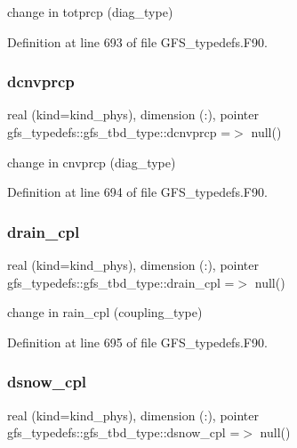 change in totprcp (diag\+\_\+type) 



Definition at line 693 of file G\+F\+S\+\_\+typedefs.\+F90.

\mbox{\label{structgfs__typedefs_1_1gfs__tbd__type_a1b0eebd6637eec35a350f3f991fa53cc}} 
\subsubsection{dcnvprcp}
{\footnotesize\ttfamily real (kind=kind\+\_\+phys), dimension  (\+:), pointer gfs\+\_\+typedefs\+::gfs\+\_\+tbd\+\_\+type\+::dcnvprcp =$>$ null()}



change in cnvprcp (diag\+\_\+type) 



Definition at line 694 of file G\+F\+S\+\_\+typedefs.\+F90.

\mbox{\label{structgfs__typedefs_1_1gfs__tbd__type_a5b9557b84e2622b9ba7d8fc0e8835231}} 
\subsubsection{drain\+\_\+cpl}
{\footnotesize\ttfamily real (kind=kind\+\_\+phys), dimension (\+:), pointer gfs\+\_\+typedefs\+::gfs\+\_\+tbd\+\_\+type\+::drain\+\_\+cpl =$>$ null()}



change in rain\+\_\+cpl (coupling\+\_\+type) 



Definition at line 695 of file G\+F\+S\+\_\+typedefs.\+F90.

\mbox{\label{structgfs__typedefs_1_1gfs__tbd__type_a445c700def954d3d0e427e88be173a9f}} 
\subsubsection{dsnow\+\_\+cpl}
{\footnotesize\ttfamily real (kind=kind\+\_\+phys), dimension (\+:), pointer gfs\+\_\+typedefs\+::gfs\+\_\+tbd\+\_\+type\+::dsnow\+\_\+cpl =$>$ null()}



